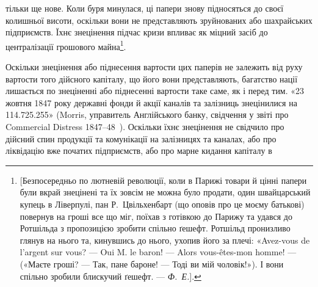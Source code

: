тільки ще нове. Коли буря минулася, ці папери знову підносяться до своєї
колишньої висоти, оскільки вони не представляють зруйнованих або шахрайських
підприємств. Їхнє знецінення підчас кризи впливає як міцний засіб до централізації
грошового майна\footnote{[Безпосередньо по лютневій революції, коли в Парижі товари й цінні папери були вкрай
знецінені та їх зовсім не можна було продати, один швайцарський купець в Ліверпулі, пан Р.~Цвільхенбарт
(що оповів про це моєму батькові) повернув на гроші все що міг, поїхав з готівкою до Парижу
та удався до Ротшільда з пропозицією зробити спільно ґешефт. Ротшільд пронизливо глянув на нього та,
кинувшись до нього, ухопив його за плечі: «Avez-vous de l’argent sur vous? — Oui M. le baron! —
Alors vous-êtes-mon homme! — («Маєте гроші? — Так, пане бароне! — Тоді ви мій чоловік!»).
І вони спільно зробили блискучий ґешефт. — \emph{Ф.~Е.}].}.

Оскільки знецінення або піднесення вартости цих паперів не залежить
від руху вартости того дійсного капіталу, що його вони представляють, багатство
нації лишається по знеціненні або піднесенні вартости таке саме, як і перед
тим. «23 жовтня 1847 року державні фонди й акції каналів та залізниць знецінилися
на \num{114.725.255}» (Morris, управитель Англійського банку, свідчення
у звіті про Commercial Distress 1847--48~). Оскільки їхнє знецінення не
свідчило про дійсний спин продукції та комунікації на залізницях та каналах,
або про ліквідацію вже початих підприємств, або про марне кидання капіталу в
\parbreak{}  %
